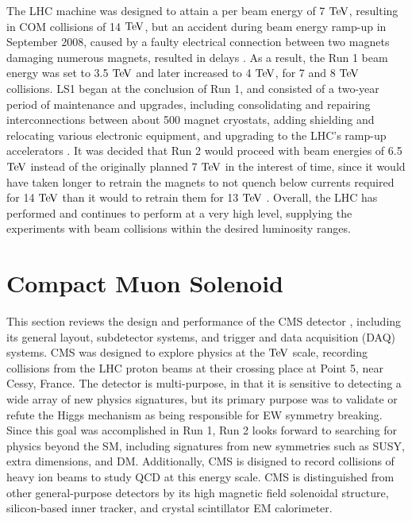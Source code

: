 \indent The LHC machine was designed to attain a per beam energy of 7 $\mathrm{Te\kern -0.1em V}$, resulting in COM collisions of 14 $\mathrm{Te\kern -0.1em V}$, but an accident during beam energy ramp-up in September 2008, caused by a faulty electrical connection between two magnets damaging numerous magnets, resulted in delays \cite{CMS:CERN3}. As a result, the Run 1 beam energy was set to 3.5 $\mathrm{Te\kern -0.1em V}$ and later increased to 4 $\mathrm{Te\kern -0.1em V}$, for 7 and 8 $\mathrm{Te\kern -0.1em V}$ collisions. LS1 began at the conclusion of Run 1, and consisted of a two-year period of maintenance and upgrades, including consolidating and repairing interconnections between about 500 magnet cryostats, adding shielding and relocating various electronic equipment, and upgrading to the LHC's ramp-up accelerators \cite{CMS:CERN1}. It was decided that Run 2 would proceed with beam energies of 6.5 $\mathrm{Te\kern -0.1em V}$ instead of the originally planned 7 $\mathrm{Te\kern -0.1em V}$ in the interest of time, since it would have taken longer to retrain the magnets to not quench below currents required for 14 $\mathrm{Te\kern -0.1em V}$ than it would to retrain them for 13 $\mathrm{Te\kern -0.1em V}$ \cite{CMS:CERN2}. Overall, the LHC has performed and continues to perform at a very high level, supplying the experiments with beam collisions within the desired luminosity ranges. 

\section{Compact Muon Solenoid}

This section reviews the design and performance of the CMS detector \cite{1748-0221-3-08-S08004}, including its general layout, subdetector systems, and trigger and data acquisition (DAQ) systems. CMS was designed to explore physics at the $\mathrm{Te\kern -0.1em V}$ scale, recording collisions from the LHC proton beams at their crossing place at Point 5, near Cessy, France. The detector is multi-purpose, in that it is sensitive to detecting a wide array of new physics signatures, but its primary purpose was to validate or refute the Higgs mechanism as being responsible for EW symmetry breaking. Since this goal was accomplished in Run 1, Run 2 looks forward to searching for physics beyond the SM, including signatures from new symmetries such as SUSY, extra dimensions, and DM. Additionally, CMS is disigned to record collisions of heavy ion beams to study QCD at this energy scale. CMS is distinguished from other general-purpose detectors by its high magnetic field solenoidal structure, silicon-based inner tracker, and crystal scintillator EM calorimeter. 


